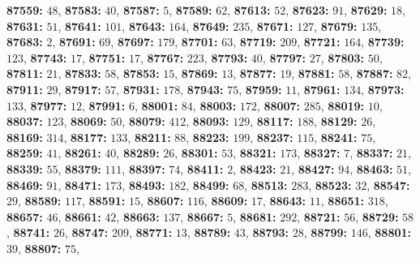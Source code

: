 \textsf{\bfseries 87559:} $48$, \textsf{\bfseries 87583:} $40$, \textsf{\bfseries 87587:} $5$, \textsf{\bfseries 87589:} $62$, \textsf{\bfseries 87613:} $52$, \textsf{\bfseries 87623:} $91$, \textsf{\bfseries 87629:} $18$, \textsf{\bfseries 87631:} $51$, \textsf{\bfseries 87641:} $101$, \textsf{\bfseries 87643:} $164$, \textsf{\bfseries 87649:} $235$, \textsf{\bfseries 87671:} $127$, \textsf{\bfseries 87679:} $135$, \textsf{\bfseries 87683:} $2$, \textsf{\bfseries 87691:} $69$, \textsf{\bfseries 87697:} $179$, \textsf{\bfseries 87701:} $63$, \textsf{\bfseries 87719:} $209$, \textsf{\bfseries 87721:} $164$, \textsf{\bfseries 87739:} $123$, \textsf{\bfseries 87743:} $17$, \textsf{\bfseries 87751:} $17$, \textsf{\bfseries 87767:} $223$, \textsf{\bfseries 87793:} $40$, \textsf{\bfseries 87797:} $27$, \textsf{\bfseries 87803:} $50$, \textsf{\bfseries 87811:} $21$, \textsf{\bfseries 87833:} $58$, \textsf{\bfseries 87853:} $15$, \textsf{\bfseries 87869:} $13$, \textsf{\bfseries 87877:} $19$, \textsf{\bfseries 87881:} $58$, \textsf{\bfseries 87887:} $82$, \textsf{\bfseries 87911:} $29$, \textsf{\bfseries 87917:} $57$, \textsf{\bfseries 87931:} $178$, \textsf{\bfseries 87943:} $75$, \textsf{\bfseries 87959:} $11$, \textsf{\bfseries 87961:} $134$, \textsf{\bfseries 87973:} $133$, \textsf{\bfseries 87977:} $12$, \textsf{\bfseries 87991:} $6$, \textsf{\bfseries 88001:} $84$, \textsf{\bfseries 88003:} $172$, \textsf{\bfseries 88007:} $285$, \textsf{\bfseries 88019:} $10$, \textsf{\bfseries 88037:} $123$, \textsf{\bfseries 88069:} $50$, \textsf{\bfseries 88079:} $412$, \textsf{\bfseries 88093:} $129$, \textsf{\bfseries 88117:} $188$, \textsf{\bfseries 88129:} $26$, \textsf{\bfseries 88169:} $314$, \textsf{\bfseries 88177:} $133$, \textsf{\bfseries 88211:} $88$, \textsf{\bfseries 88223:} $199$, \textsf{\bfseries 88237:} $115$, \textsf{\bfseries 88241:} $75$, \textsf{\bfseries 88259:} $41$, \textsf{\bfseries 88261:} $40$, \textsf{\bfseries 88289:} $26$, \textsf{\bfseries 88301:} $53$, \textsf{\bfseries 88321:} $173$, \textsf{\bfseries 88327:} $7$, \textsf{\bfseries 88337:} $21$, \textsf{\bfseries 88339:} $55$, \textsf{\bfseries 88379:} $111$, \textsf{\bfseries 88397:} $74$, \textsf{\bfseries 88411:} $2$, \textsf{\bfseries 88423:} $21$, \textsf{\bfseries 88427:} $94$, \textsf{\bfseries 88463:} $51$, \textsf{\bfseries 88469:} $91$, \textsf{\bfseries 88471:} $173$, \textsf{\bfseries 88493:} $182$, \textsf{\bfseries 88499:} $68$, \textsf{\bfseries 88513:} $283$, \textsf{\bfseries 88523:} $32$, \textsf{\bfseries 88547:} $29$, \textsf{\bfseries 88589:} $117$, \textsf{\bfseries 88591:} $15$, \textsf{\bfseries 88607:} $116$, \textsf{\bfseries 88609:} $17$, \textsf{\bfseries 88643:} $11$, \textsf{\bfseries 88651:} $318$, \textsf{\bfseries 88657:} $46$, \textsf{\bfseries 88661:} $42$, \textsf{\bfseries 88663:} $137$, \textsf{\bfseries 88667:} $5$, \textsf{\bfseries 88681:} $292$, \textsf{\bfseries 88721:} $56$, \textsf{\bfseries 88729:} $58$, \textsf{\bfseries 88741:} $26$, \textsf{\bfseries 88747:} $209$, \textsf{\bfseries 88771:} $13$, \textsf{\bfseries 88789:} $43$, \textsf{\bfseries 88793:} $28$, \textsf{\bfseries 88799:} $146$, \textsf{\bfseries 88801:} $39$, \textsf{\bfseries 88807:} $75$, 
